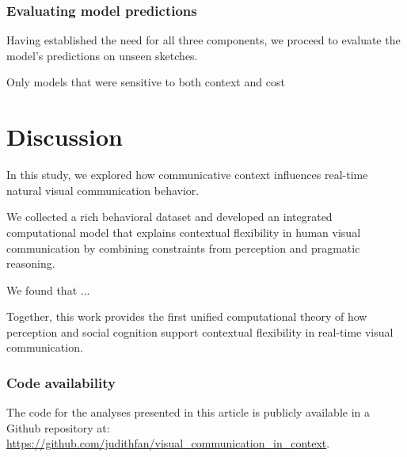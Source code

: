 \documentclass[9pt,twocolumn,twoside]{pnas-new}
\begin{document}


\subsubsection*{Evaluating model predictions}

Having established the need for all three components, we proceed to evaluate the model's predictions on unseen sketches.

Only models that were sensitive to both context and cost 



\section*{Discussion}

In this study, we explored how communicative context influences real-time natural visual communication behavior.

We collected a rich behavioral dataset and developed an integrated computational model that explains contextual flexibility in human visual communication by combining constraints from perception and pragmatic reasoning.

We found that ... 






Together, this work provides the first unified computational theory of how perception and social cognition support contextual flexibility in real-time visual communication.

\subsubsection*{Code availability} The code for the analyses presented in this article is publicly available in a Github repository at: \url{https://github.com/judithfan/visual_communication_in_context}.
\end{document}
